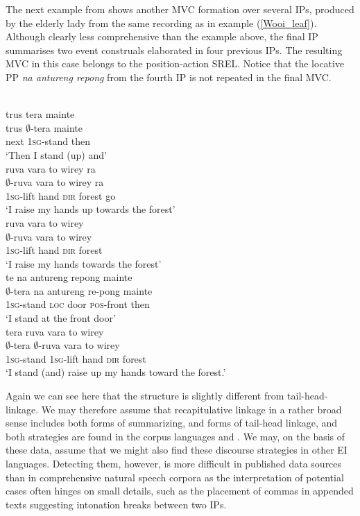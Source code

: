 The next example from  shows another MVC formation over several IPs, produced by the elderly  lady from the same recording as in example (\ref{Wooi_leaf}). Although clearly less comprehensive than the  example above, the final IP summarises two event construals elaborated in four previous IPs. The resulting MVC in this case belongs to the position-action SREL. Notice that the locative PP \textit{na antureng repong} from the fourth IP is not repeated in the final MVC.

\ea
{}\\
\ea
\glll trus tera mainte \\
trus $\emptyset$-tera mainte \\
next \textsc{1}\textsc{sg}-stand then \\
\glft `Then I stand (up) and'\\
\ex
\glll ruva vara to wirey ra \\
$\emptyset$-ruva vara to wirey ra \\
\textsc{1}\textsc{sg}-lift hand \textsc{dir} forest go \\
\glft `I raise my hands up towards the forest'\\
\ex
\glll ruva vara to wirey \\
$\emptyset$-ruva vara to wirey \\
\textsc{1}\textsc{sg}-lift hand \textsc{dir} forest \\
\glft `I raise my hands towards the forest'\\
\ex
\glll te na antureng repong mainte \\
$\emptyset$-tera na antureng re-pong mainte \\
\textsc{1}\textsc{sg}-stand \textsc{loc} door \textsc{pos}-front then \\
\glft `I stand at the front door'\\
\ex
\glll tera ruva vara to wirey \\
$\emptyset$-tera $\emptyset$-ruva vara to wirey \\
\textsc{1}\textsc{sg}-stand \textsc{1}\textsc{sg}-lift hand \textsc{dir} forest \\
\glft `I stand (and) raise up my hands toward the forest.'\\
\z
\z

Again we can see here that the structure is slightly different from tail-head-linkage. We may therefore assume that recapitulative linkage in a rather broad sense includes both forms of summarizing, and forms of tail-head linkage, and both strategies are found in the corpus languages  and . We may, on the basis of these data, assume that we might also find these discourse strategies in other EI languages. Detecting them, however, is more difficult in published data sources than in comprehensive natural speech corpora as the interpretation of potential cases often hinges on small details, such as the placement of commas in appended texts suggesting intonation breaks between two IPs.

